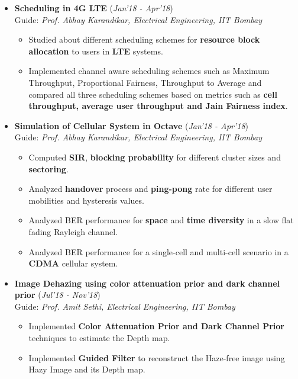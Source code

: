 \documentclass[10pt]{article}
\begin{document}

\colorbox{bl}{}

\begin{itemize}[leftmargin=0.4cm]


	
\item \textbf{Scheduling in 4G LTE }
\hfill{(\textit{Jan'18 - Apr'18})}\\
Guide: \textit{Prof. Abhay Karandikar, Electrical Engineering, IIT Bombay}

	\begin{itemize}
	\item Studied about different scheduling schemes for \textbf{resource block allocation} to users in \textbf{LTE} systems.
	\item Implemented channel aware scheduling schemes such as Maximum Throughput, Proportional Fairness, Throughput to Average and compared all three scheduling schemes based on metrics such as \textbf{cell throughput, average user throughput and Jain Fairness index}.
    \end{itemize}

	
	
\item \textbf{Simulation of Cellular System in Octave}
\hfill{(\textit{Jan'18 - Apr'18})}\\
Guide: \textit{Prof. Abhay Karandikar, Electrical Engineering, IIT Bombay}
	\begin{itemize}
	\item Computed \textbf{SIR}, \textbf{blocking probability} for different cluster sizes and \textbf{sectoring}.
	\item Analyzed \textbf{handover} process and \textbf{ping-pong} rate for different user mobilities and hysteresis values.
	\item Analyzed BER performance for \textbf{space} and \textbf{time diversity} in a slow flat fading Rayleigh channel.
	\item Analyzed BER performance for a single-cell and multi-cell scenario in a \textbf{CDMA} cellular system.
    \end{itemize}

		
	



\item \textbf{Image Dehazing using color attenuation prior and dark channel prior 
} \hfill{(\textit{Jul'18 - Nov'18})}\\
Guide: \textit{Prof. Amit Sethi, Electrical Engineering, IIT Bombay}
	\begin{itemize}
	\item Implemented \textbf{Color Attenuation Prior and Dark Channel Prior} techniques to estimate the Depth map.
	\item Implemented \textbf{Guided Filter} to reconstruct the Haze-free image using Hazy Image and its Depth map.
	\end{itemize}
	


\end{itemize}
\end{document}
